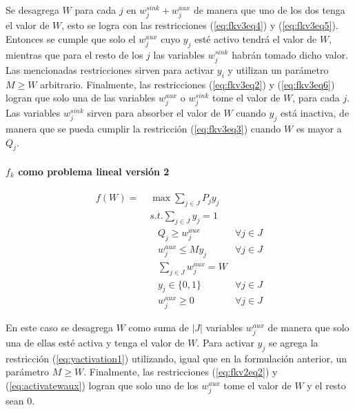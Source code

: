 Se desagrega $W$ para cada $j$ en $w^{sink}_j + w^{aux}_j$ de manera que uno de los dos tenga el valor de $W$, esto se logra con las restricciones (\ref{eq:fkv3eq4}) y (\ref{eq:fkv3eq5}). Entonces se cumple que solo el $w^{aux}_j$ cuyo $y_j$ esté activo tendrá el valor de $W$, mientras que para el resto de los $j$ las variables $w^{sink}_j$ habrán tomado dicho valor. Las mencionadas restricciones sirven para activar $y_i$ y utilizan un parámetro $M \geq W$ arbitrario. Finalmente, las restricciones (\ref{eq:fkv3eq2}) y (\ref{eq:fkv3eq6}) logran que solo una de las variables $w^{aux}_j$ o $w^{sink}_j$ tome el valor de $W$, para cada $j$. Las variables $w^{sink}_j$ sirven para absorber el valor de $W$ cuando $y_j$ está inactiva, de manera que se pueda cumplir la restricción (\ref{eq:fkv3eq3}) cuando $W$ es mayor a $Q_j$.

\paragraph*{$f_k$ como problema lineal versión 2}

\begin{align}
  f(W) =\; & \max \sum_{j \in J} P_j y_j             & \label{eq:fkv2eq1}\\
           & s.t. \sum_{j \in J} y_j = 1            & \label{eq:fkv2eq2}\\
           & \;\;\; Q_j \geq w^{aux}_j              & \forall j \in J \label{eq:implfkoriginalineq} \\
           & \;\;\; w^{aux}_j \leq M y_j            & \forall j \in J \label{eq:yactivation1} \\
           & \;\;\; \sum_{j \in J} w^{aux}_j = W    & \label{eq:activatewaux} \\
           & \;\;\; y_j \in \{0,1\}                 & \label{eq:fkv2domainy} \forall j \in J\\
           & \;\;\; w^{aux}_j \geq 0                & \label{eq:fkv2eq6} \forall j \in J
\end{align}

En este caso se desagrega $W$ como suma de $|J|$ variables $w^{aux}_j$ de manera que solo una de ellas esté activa y tenga el valor de $W$. Para activar $y_j$ se agrega la restricción (\ref{eq:yactivation1}) utilizando, igual que en la formulación anterior, un parámetro $M \geq W$. Finalmente, las restricciones (\ref{eq:fkv2eq2}) y (\ref{eq:activatewaux}) logran que solo uno de los $w^{aux}_j$ tome el valor de $W$ y el resto sean 0.

